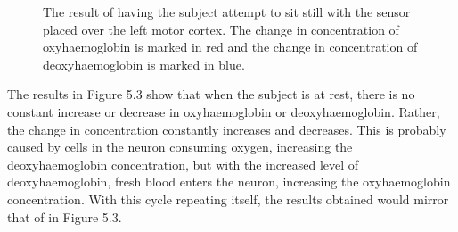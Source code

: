 \begin{figure}[htp]
\centering
{}
\caption[Left Motor Cortex Measurements with No Motor Movement]{The result of having the subject attempt to sit still with the sensor placed over the left motor cortex. The change in concentration of oxyhaemoglobin is marked in red and the change in concentration of deoxyhaemoglobin is marked in blue.}
\end{figure}

The results in Figure 5.3 show that when the subject is at rest, there is no constant increase or decrease in oxyhaemoglobin or deoxyhaemoglobin. Rather, the change in concentration constantly increases and decreases. This is probably caused by cells in the neuron consuming oxygen, increasing the deoxyhaemoglobin concentration, but with the increased level of deoxyhaemoglobin, fresh blood enters the neuron, increasing the oxyhaemoglobin concentration. With this cycle repeating itself, the results obtained would mirror that of in Figure 5.3.

